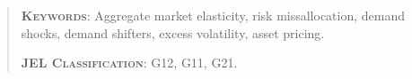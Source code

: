 \begin{abstract}
  \vspace{10mm} 
  \bigskip
  
  \noindent 
  \textsc{\textbf{Keywords}}: Aggregate market elasticity, risk missallocation, demand shocks, demand shifters, excess volatility, asset pricing. 
  
  \medskip
  \noindent
  \textsc{\textbf{JEL Classification}}: G12, G11, G21.   
\end{abstract}
	
\newpage
\doublespacing
\setcounter{page}{1}
	

\newpage

